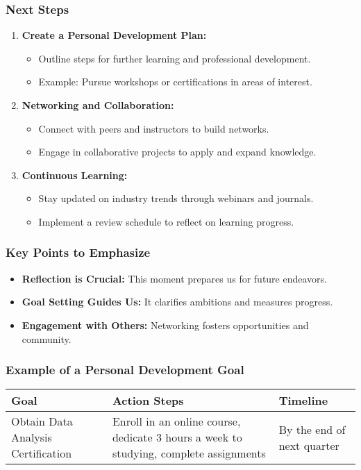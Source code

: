 \documentclass[aspectratio=169]{beamer}
\begin{document}
\begin{frame}[fragile]
    \frametitle{Next Steps}
    \begin{enumerate}
        \item \textbf{Create a Personal Development Plan:}
            \begin{itemize}
                \item Outline steps for further learning and professional development.
                \item Example: Pursue workshops or certifications in areas of interest.
            \end{itemize}
        
        \item \textbf{Networking and Collaboration:}
            \begin{itemize}
                \item Connect with peers and instructors to build networks.
                \item Engage in collaborative projects to apply and expand knowledge.
            \end{itemize}
        
        \item \textbf{Continuous Learning:}
            \begin{itemize}
                \item Stay updated on industry trends through webinars and journals.
                \item Implement a review schedule to reflect on learning progress.
            \end{itemize}
    \end{enumerate}
\end{frame}

\begin{frame}[fragile]
    \frametitle{Key Points to Emphasize}
    \begin{itemize}
        \item \textbf{Reflection is Crucial:} This moment prepares us for future endeavors.
        \item \textbf{Goal Setting Guides Us:} It clarifies ambitions and measures progress.
        \item \textbf{Engagement with Others:} Networking fosters opportunities and community.
    \end{itemize}
\end{frame}

\begin{frame}[fragile]
    \frametitle{Example of a Personal Development Goal}
    \begin{tabular}{|l|l|l|}
        \hline
        \textbf{Goal} & \textbf{Action Steps} & \textbf{Timeline} \\
        \hline
        Obtain Data Analysis Certification & Enroll in an online course, dedicate 3 hours a week to studying, complete assignments & By the end of next quarter \\
        \hline
    \end{tabular}
\end{frame}
\end{document}
